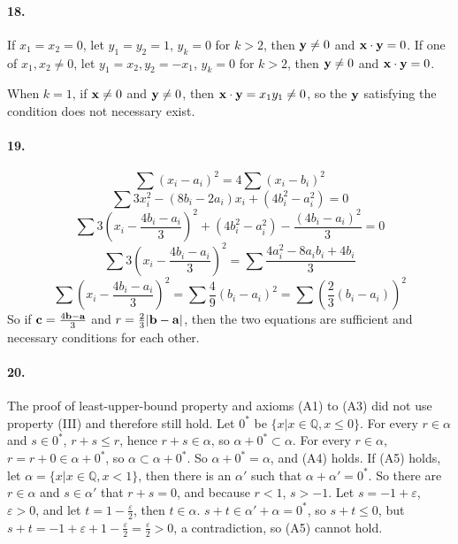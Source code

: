 \documentclass[a4paper]{article}
\begin{document}
\paragraph{18.}
If $x_1=x_2=0$, let $y_1=y_2=1$, $y_k=0$ for $k>2$, then $\mathbf{y}\neq0$ and $\mathbf{x}\cdot\mathbf{y}=0$. If one of $x_1,x_2\neq0$, let $y_1=x_2, y_2=-x_1$, $y_k=0$ for $k>2$, then $\mathbf{y}\neq0$ and $\mathbf{x}\cdot\mathbf{y}=0$.

When $k=1$, if $\mathbf{x}\neq0$ and $\mathbf{y}\neq0$, then $\mathbf{x}\cdot\mathbf{y}=x_1y_1\neq0$, so the $\mathbf{y}$ satisfying the condition does not necessary exist.

\paragraph{19.}
\[\sum(x_i-a_i)^2=4\sum(x_i-b_i)^2\]
\[\sum3x_i^2-(8b_i-2a_i)x_i+(4b_i^2-a_i^2) =0\]
\[\sum3(x_i-\frac{4b_i-a_i}{3})^2+(4b_i^2-a_i^2)-\frac{(4b_i-a_i)^2}{3}=0\]
\[\sum3(x_i-\frac{4b_i-a_i}{3})^2=\sum\frac{4a_i^2-8a_ib_i+4b_i}{3}\]
\[\sum(x_i-\frac{4b_i-a_i}{3})^2=\sum\frac{4}{9}(b_i-a_i)^2=\sum(\frac{2}{3}(b_i-a_i))^2\]
So if $\mathbf{c}=\frac{4\mathbf{b}-\mathbf{a}}{3}$ and $r=\frac{2}{3}|\mathbf{b}-\mathbf{a}|$, then the two equations are sufficient and necessary conditions for each other.

\paragraph{20.}
The proof of least-upper-bound property and axioms (A1) to (A3) did not use property (III) and therefore still hold. Let $0^*$ be $\{x|x\in\mathbb{Q},x\leq0 \}$. For every $r\in\alpha$ and $s\in0^*$, $r+s\leq r$, hence $r+s\in\alpha$, so $\alpha+0^*\subset\alpha$. For every $r\in\alpha$, $r=r+0\in\alpha+0^*$, so $\alpha\subset\alpha+0^*$. So $\alpha+0^*=\alpha$, and (A4) holds. If (A5) holds, let $\alpha=\{x|x\in\mathbb{Q},x<1\}$, then there is an $\alpha'$ such that $\alpha+\alpha'=0^*$. So there are $r\in\alpha$ and $s\in\alpha'$ that $r+s=0$, and because $r<1$, $s>-1$. Let $s=-1+\varepsilon$, $\varepsilon>0$, and let $t=1-\frac{\varepsilon}{2}$, then $t\in\alpha$. $s+t\in\alpha'+\alpha=0^*$, so $s+t\leq0$, but $s+t=-1+\varepsilon+1-\frac{\varepsilon}{2}=\frac{\varepsilon}{2}>0$, a contradiction, so (A5) cannot hold.
\end{document}
